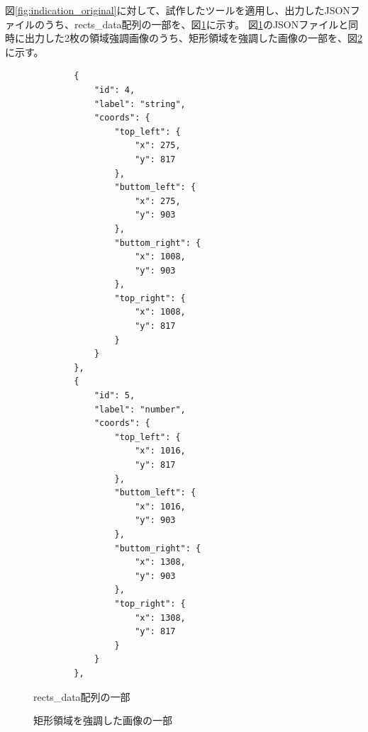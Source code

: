 図\ref{fig:indication_original}に対して、試作したツールを適用し、出力したJSONファイルのうち、rects\_data配列の一部を、図\ref{fig:rects_data_json}に示す。
図\ref{fig:rects_data_json}のJSONファイルと同時に出力した2枚の領域強調画像のうち、矩形領域を強調した画像の一部を、図\ref{fig:highlighted_rects_part}に示す。

\lstset{language=}
\begin{figure}[t]
    \begin{lstlisting}
        {
            "id": 4,
            "label": "string",
            "coords": {
                "top_left": {
                    "x": 275,
                    "y": 817
                },
                "buttom_left": {
                    "x": 275,
                    "y": 903
                },
                "buttom_right": {
                    "x": 1008,
                    "y": 903
                },
                "top_right": {
                    "x": 1008,
                    "y": 817
                }
            }
        },
        {
            "id": 5,
            "label": "number",
            "coords": {
                "top_left": {
                    "x": 1016,
                    "y": 817
                },
                "buttom_left": {
                    "x": 1016,
                    "y": 903
                },
                "buttom_right": {
                    "x": 1308,
                    "y": 903
                },
                "top_right": {
                    "x": 1308,
                    "y": 817
                }
            }
        },
    \end{lstlisting}
    \caption{rects\_data配列の一部}\label{fig:rects_data_json}
\end{figure}

\begin{figure}[t]
    \begin{center}
        \caption{矩形領域を強調した画像の一部}
        \label{fig:highlighted_rects_part}
    \end{center}
\end{figure}


